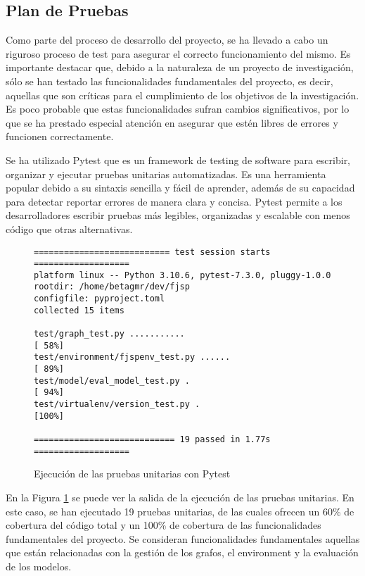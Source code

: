 \subsection{Plan de Pruebas}
Como parte del proceso de desarrollo del proyecto, se ha llevado a cabo un riguroso 
proceso de test para asegurar el correcto funcionamiento del mismo. Es importante 
destacar que, debido a la naturaleza de un proyecto de investigación, sólo se han 
testado las funcionalidades fundamentales del proyecto, es decir, aquellas que 
son críticas para el cumplimiento de los objetivos de la investigación. Es poco 
probable que estas funcionalidades sufran cambios significativos, por lo que se ha 
prestado especial atención en asegurar que estén libres de errores y funcionen correctamente.\medskip

Se ha utilizado Pytest \cite{pytest} que es un framework de testing de software para escribir, 
organizar y ejecutar pruebas unitarias automatizadas. Es una herramienta popular 
debido a su sintaxis sencilla y fácil de aprender, además de su capacidad para detectar 
reportar errores de manera clara y concisa. Pytest permite a los desarrolladores 
escribir pruebas más legibles, organizadas y escalable con menos código 
que otras alternativas. 

\begin{figure}[ht]
    \label{fig:pytest-output}
    \begin{lstlisting}
=========================== test session starts ===================
platform linux -- Python 3.10.6, pytest-7.3.0, pluggy-1.0.0
rootdir: /home/betagmr/dev/fjsp
configfile: pyproject.toml
collected 15 items                                                         

test/graph_test.py ...........                               [ 58%]
test/environment/fjspenv_test.py ......                      [ 89%]
test/model/eval_model_test.py .                              [ 94%]
test/virtualenv/version_test.py .                            [100%]

============================ 19 passed in 1.77s =================== 
    \end{lstlisting}
    \caption{Ejecución de las pruebas unitarias con Pytest}
\end{figure}

En la Figura \ref{fig:pytest-output} se puede ver la salida de la ejecución de las
pruebas unitarias. En este caso, se han ejecutado 19 pruebas unitarias, de las cuales
ofrecen un 60\% de cobertura del código total y un 100\% de cobertura de las funcionalidades
fundamentales del proyecto. Se consideran funcionalidades fundamentales aquellas que
están relacionadas con la gestión de los grafos, el environment y la evaluación de los
modelos.
